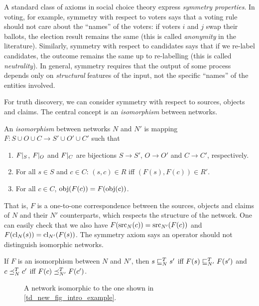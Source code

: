A standard class of axioms in social choice theory express \emph{symmetry
properties}. In voting, for example, symmetry with respect to voters says that
a voting rule should not care about the ``names'' of the voters: if voters $i$
and $j$ swap their ballots, the election result remains the same (this is
called \emph{anonymity} in the literature). Similarly, symmetry with respect to
candidates says that if we re-label candidates, the outcome remains the same up
to re-labelling (this is called \emph{neutrality}). In general, symmetry
requires that the output of some process depends only on \emph{structural}
features of the input, not the specific ``names'' of the entities involved.

For truth discovery, we can consider symmetry with respect to sources, objects
and claims. The central concept is an \emph{isomorphism} between networks.

\begin{definition}
    An \emph{isomorphism} between networks $N$ and $N'$ is mapping $F: S \cup O
    \cup C \to S' \cup O' \cup C'$ such that
    \begin{enumerate}
        \item $F|_{S}$, $F|_{O}$ and $F|_{C}$ are
              bijections $S \to S'$, $O \to O'$ and $C \to C'$, respectively.
        \item For all $s \in S$ and $c \in C$: $(s, c) \in R$ iff $(F(s), F(c))
              \in R'$.
        \item For all $c \in C$, $\operatorname{obj}(F(c)) = F(\operatorname{obj}(c))$.
    \end{enumerate}
\end{definition}

That is, $F$ is a one-to-one correspondence between the sources, objects and
claims of $N$ and their $N'$ counterparts, which respects the structure of the
network. One can easily check that we also have $F(\operatorname{src}_N(c)) =
\operatorname{src}_{N'}(F(c))$ and $F(\operatorname{cl}_N(s)) = \operatorname{cl}_{N'}(F(s))$.
%
The symmetry axiom says an operator should not distinguish isomorphic networks.

\begin{axiom}[\symmetry{}]
    If $F$ is an isomorphism between $N$ and $N'$, then
    $s \sqsubseteq_N^T s'$ iff $F(s) \sqsubseteq_{N'}^T F(s')$ and $c \preceq_N^T c'$ iff $F(c)
    \preceq_{N'}^T F(c')$.
\end{axiom}

\begin{figure}
    \centering
    \caption{
        A network isomorphic to the one shown in \cref{td_new_fig_intro_example}.
    }
    \label{td_new_fig_symmetry_example}
\end{figure}

